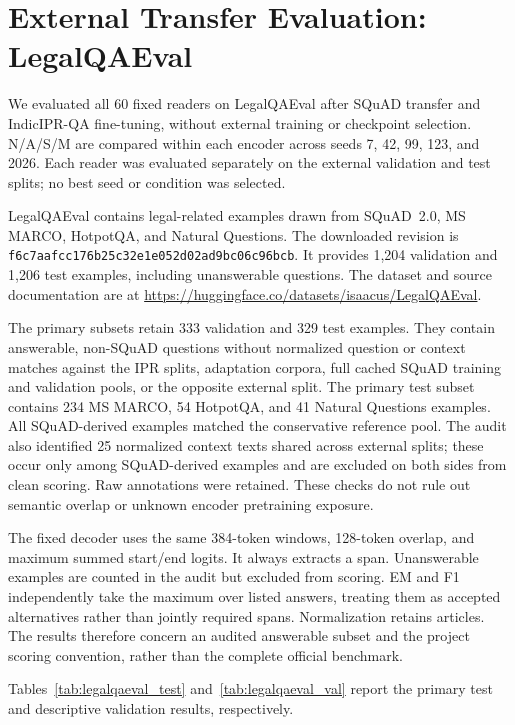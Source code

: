 \documentclass[pdflatex,sn-basic]{sn-jnl}
\begin{document}
\FloatBarrier
\section{External Transfer Evaluation: LegalQAEval}
\label{sec:external_legalqaeval}

We evaluated all 60 fixed readers on LegalQAEval after SQuAD transfer
and IndicIPR-QA fine-tuning, without external training or checkpoint
selection. N/A/S/M are compared within each encoder across seeds 7, 42,
99, 123, and 2026. Each reader was evaluated separately on the external
validation and test splits; no best seed or condition was selected.

LegalQAEval contains legal-related examples drawn from SQuAD~2.0,
MS MARCO, HotpotQA, and Natural Questions. The downloaded revision is
\texttt{f6c7aafcc176b25c32e1e052d02ad9bc06c96bcb}.
It provides 1,204 validation and 1,206 test examples, including
unanswerable questions. The dataset and source documentation are at
\url{https://huggingface.co/datasets/isaacus/LegalQAEval}.

The primary subsets retain 333 validation and 329 test examples.
They contain answerable, non-SQuAD questions without normalized
question or context matches against the IPR splits, adaptation
corpora, full cached SQuAD training and validation pools, or the
opposite external split. The primary test subset contains 234
MS MARCO, 54 HotpotQA, and 41 Natural Questions examples. All
SQuAD-derived examples matched the conservative reference pool.
The audit also identified 25 normalized context texts shared across
external splits; these occur only among SQuAD-derived examples and
are excluded on both sides from clean scoring. Raw annotations
were retained. These checks do not rule out semantic overlap or
unknown encoder pretraining exposure.

The fixed decoder uses the same 384-token windows, 128-token overlap,
and maximum summed start/end logits. It always extracts a span.
Unanswerable examples are counted in the audit but excluded from
scoring. EM and F1 independently take the maximum over listed answers,
treating them as accepted alternatives rather than jointly required
spans. Normalization retains articles. The results therefore concern
an audited answerable subset and the project scoring convention,
rather than the complete official benchmark.

Tables~\ref{tab:legalqaeval_test} and~\ref{tab:legalqaeval_val} report the
primary test and descriptive validation results, respectively.
\end{document}
